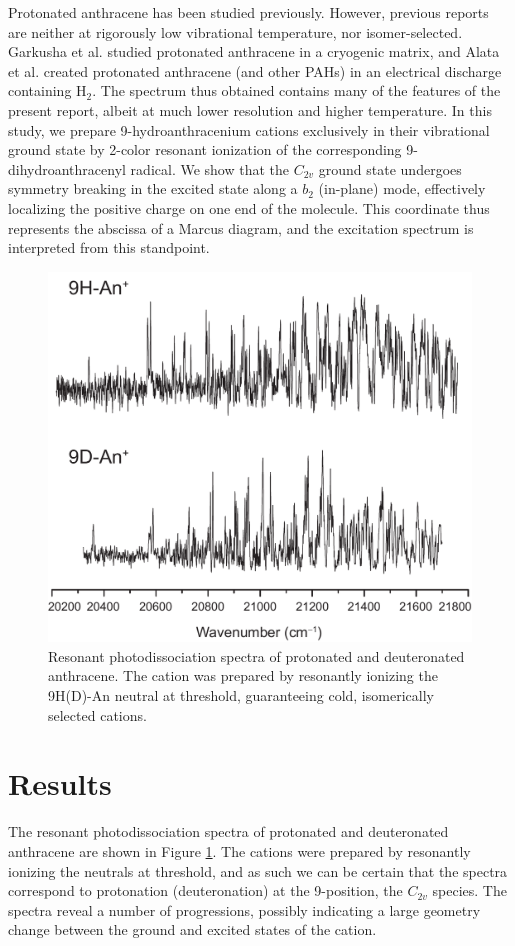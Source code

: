 \documentclass[12pt]{article}
\begin{document}
Protonated anthracene has been studied previously. However, previous reports are neither at rigorously low vibrational temperature, nor isomer-selected. Garkusha et al. studied protonated anthracene in a cryogenic matrix, and Alata et al. created protonated anthracene (and other PAHs) in an electrical discharge containing H$_2$. The spectrum thus obtained contains many of the features of the present report, albeit at much lower resolution and higher temperature. In this study, we prepare 9-hydroanthracenium cations exclusively in their vibrational ground state by 2-color resonant ionization of the corresponding 9-dihydroanthracenyl radical. We show that the $C_{2v}$ ground state undergoes symmetry breaking in the excited state along a $b_2$ (in-plane) mode, effectively localizing the positive charge on one end of the molecule. This coordinate thus represents the abscissa of a Marcus diagram, and the excitation spectrum is interpreted from this standpoint.

\begin{figure}
\centering
\includegraphics[width=12cm]{spectra}
\caption{Resonant photodissociation spectra of protonated and deuteronated anthracene. The cation was prepared by resonantly ionizing the 9H(D)-An neutral at threshold, guaranteeing cold, isomerically selected cations.\label{spectra}}
\end{figure}

\section*{Results}
The resonant photodissociation spectra of protonated and deuteronated anthracene are shown in Figure \ref{spectra}. The cations were prepared by resonantly ionizing the neutrals at threshold, and as such we can be certain that the spectra correspond to protonation (deuteronation) at the 9-position, the $C_{2v}$ species. The spectra reveal a number of progressions, possibly indicating a large geometry change between the ground and excited states of the cation.
\end{document}
